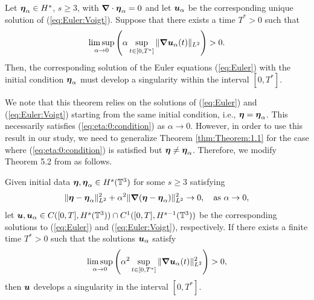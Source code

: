\begin{thm}\label{thm:Theorem:1.1}
Let ${\boldsymbol \eta_\alpha}\in H^s$, $s\geq 3$, with ${\boldsymbol \nabla} \cdot {\boldsymbol \eta_\alpha} = 0$ and let $\boldsymbol u_\alpha$ be the corresponding unique solution of (\ref{eq:Euler:Voigt}). Suppose that there exists a time $T^*>0$ such that
\begin{equation}
\limsup_{\alpha \rightarrow 0} \left( \alpha \sup_{t\in[0,T^*]} \|{\boldsymbol \nabla} \boldsymbol u_\alpha(t)\|_{L^2}\right) > 0.
\end{equation}
Then, the corresponding solution of the Euler equations (\ref{eq:Euler}) with the initial condition ${\boldsymbol \eta}_\alpha$ must develop a singularity within the interval $[0,T^*]$.
\end{thm}
\noindent We note that this theorem relies on the solutions of (\ref{eq:Euler}) and (\ref{eq:Euler:Voigt}) starting from the same initial condition, i.e., ${\boldsymbol \eta} = {\boldsymbol \eta_\alpha}$. This necessarily satisfies (\ref{eq:eta:0:condition}) as $\alpha\rightarrow 0$. However, in order to use this result in our study, we need to generalize Theorem \ref{thm:Theorem:1.1} for the case where (\ref{eq:eta:0:condition}) is satisfied but ${\boldsymbol \eta} \neq {\boldsymbol \eta_\alpha}$. Therefore, we modify Theorem 5.2 from \cite{larios_higher-order_2010} as follows. \begin{thm}\label{thm:Theorem:1.3}
Given initial data ${\boldsymbol \eta},{\boldsymbol \eta_\alpha} \in H^s(\mathbb{T}^3)$ for some $s\geq 3$ satisfying
\begin{equation}
\|{\boldsymbol \eta}-{\boldsymbol \eta_\alpha}\|_{L^2}^2+\alpha^2\|{\boldsymbol \nabla}({\boldsymbol \eta}-{\boldsymbol \eta_\alpha})\|_{L^2}^2 \rightarrow 0, \quad \text{as } \alpha\rightarrow 0,
\end{equation} 
let $\boldsymbol u,\boldsymbol u_\alpha \in C([0,T],H^s(\mathbb{T}^3))\cap C^1([0,T],H^{s-1}(\mathbb{T}^3))$ be the corresponding solutions to (\ref{eq:Euler}) and (\ref{eq:Euler:Voigt}), respectively. If there exists a finite time $T^*>0$ such that the solutions $\boldsymbol u_\alpha$ satisfy
\begin{equation}\label{eq:alpha:sup}
\limsup_{\alpha \rightarrow 0} \left( \alpha^2 \sup_{t\in[0,T^*]} \|{\boldsymbol \nabla} \boldsymbol u_\alpha(t)\|_{L^2}^2\right) > 0,
\end{equation}
then $\boldsymbol u$ develops a singularity in the interval $[0,T^*]$.
\end{thm}

